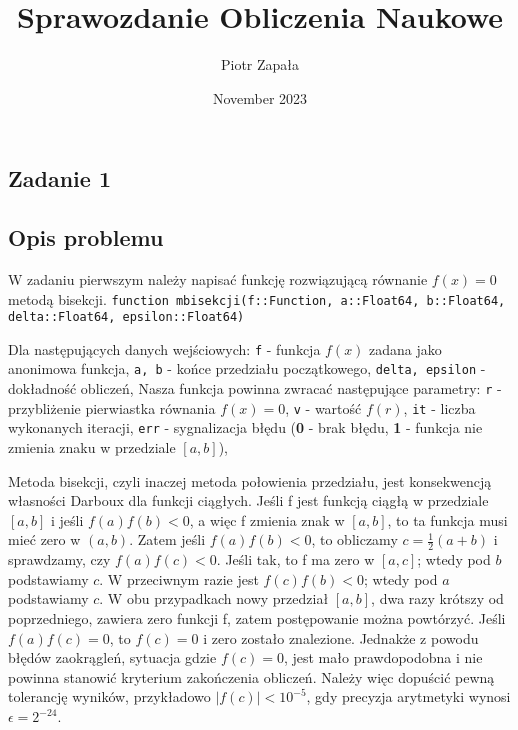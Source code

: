 \documentclass{article}
\title{Sprawozdanie Obliczenia Naukowe}
\author{Piotr Zapała}
\date{November 2023}
\begin{document}
\maketitle

\tableofcontents
\newpage
\begin{center}
    \section{Zadanie 1}
    \subsection{Opis problemu}
    \large W zadaniu pierwszym należy napisać funkcję rozwiązującą równanie \(f(x) = 0\) metodą bisekcji. \newline
     \texttt{function mbisekcji(f::Function, a::Float64, b::Float64, delta::Float64, epsilon::Float64)} 
     \begin{flushleft}
        Dla następujących danych wejściowych: \newline
        \texttt{f} - funkcja \(f(x)\) zadana jako anonimowa funkcja, \newline
        \texttt{a, b} - końce przedziału początkowego, \newline
        \texttt{delta, epsilon} - dokładność obliczeń, \newline
        \newline
        Nasza funkcja powinna zwracać następujące parametry: \newline
        \texttt{r} - przybliżenie pierwiastka równania \(f(x) = 0\), \newline
        \texttt{v} - wartość \(f(r)\), \newline
        \texttt{it} - liczba wykonanych iteracji, \newline
        \texttt{err} - sygnalizacja błędu (\textbf{0} - brak błędu, \textbf{1} - funkcja nie zmienia znaku w przedziale \([a, b]\)), \newline
     \end{flushleft}
     Metoda bisekcji, czyli inaczej metoda połowienia przedziału, jest konsekwencją własności Darboux dla funkcji ciągłych.
     Jeśli f jest funkcją ciągłą w przedziale \([a, b]\) i jeśli \(f(a)f(b) < 0\), a więc f zmienia znak w \([a, b]\),
     to ta funkcja musi mieć zero w \((a, b)\). Zatem jeśli \(f(a)f(b) < 0\), to obliczamy \(c = \frac{1}{2}(a + b)\)
     i sprawdzamy, czy \(f(a)f(c) < 0\). Jeśli tak, to f ma zero w \([a, c]\); wtedy pod \(b\) podstawiamy \(c\).
     W przeciwnym razie jest \(f(c)f(b) < 0\); wtedy pod \(a\) podstawiamy \(c\). W obu przypadkach nowy przedział \([a, b]\), 
     dwa razy krótszy od poprzedniego, zawiera zero funkcji f, zatem postępowanie można powtórzyć. Jeśli \(f(a)f(c) = 0\), to \(f(c) = 0\) i zero zostało znalezione.
     Jednakże z powodu błędów zaokrągleń, sytuacja gdzie \(f(c) = 0\), jest mało prawdopodobna i nie powinna stanowić kryterium zakończenia obliczeń.
     Należy więc dopuścić pewną tolerancję wyników, przykładowo \(|f(c)| < 10^{-5}\), gdy precyzja arytmetyki wynosi \(\epsilon = 2^{-24}\).


\end{center}
\end{document}
